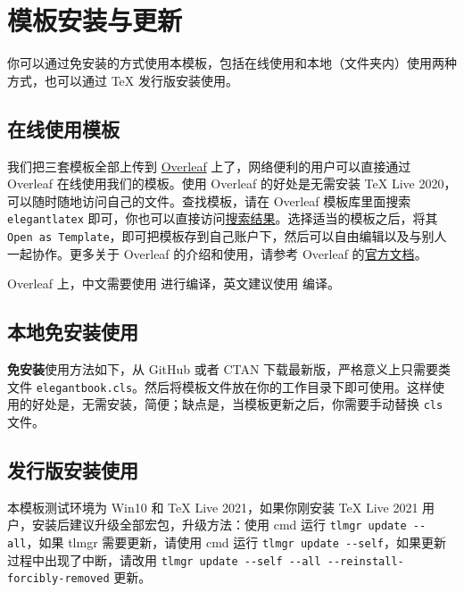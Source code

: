 \documentclass[cn,10pt,math=newtx,citestyle=gb7714-2015,bibstyle=gb7714-2015]{elegantbook}
\begin{document}
\section{模板安装与更新}

你可以通过免安装的方式使用本模板，包括在线使用和本地（文件夹内）使用两种方式，也可以通过 \TeX{} 发行版安装使用。

\subsection{在线使用模板}

我们把三套模板全部上传到 \href{https://www.overleaf.com/}{Overleaf} 上了，网络便利的用户可以直接通过 Overleaf 在线使用我们的模板。使用 Overleaf 的好处是无需安装 \TeX{} Live 2020，可以随时随地访问自己的文件。查找模板，请在 Overleaf 模板库里面搜索 \lstinline{elegantlatex} 即可，你也可以直接访问\href{https://www.overleaf.com/latex/templates?addsearch=elegantlatex}{搜索结果}。选择适当的模板之后，将其 \lstinline{Open as Template}，即可把模板存到自己账户下，然后可以自由编辑以及与别人一起协作。更多关于 Overleaf 的介绍和使用，请参考 Overleaf 的\href{https://www.overleaf.com/learn}{官方文档}。

\begin{remark}
Overleaf 上，中文需要使用  进行编译，英文建议使用  编译。
\end{remark}

\subsection{本地免安装使用}

\textbf{免安装}使用方法如下，从 GitHub 或者 CTAN 下载最新版，严格意义上只需要类文件 \lstinline{elegantbook.cls}。然后将模板文件放在你的工作目录下即可使用。这样使用的好处是，无需安装，简便；缺点是，当模板更新之后，你需要手动替换 \lstinline{cls} 文件。

\subsection{发行版安装使用}

本模板测试环境为 Win10 和 TeX Live 2021，如果你刚安装 \TeX{} Live 2021 用户，安装后建议升级全部宏包，升级方法：使用 cmd 运行 \lstinline{tlmgr update --all}，如果 tlmgr 需要更新，请使用 cmd 运行 \lstinline{tlmgr update --self}，如果更新过程中出现了中断，请改用 \lstinline{tlmgr update --self --all --reinstall-forcibly-removed} 更新。
\end{document}
